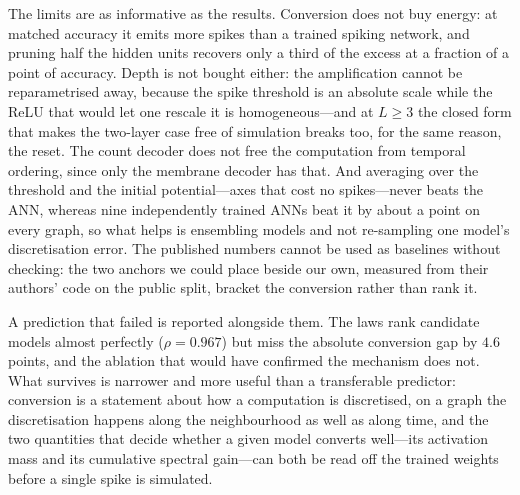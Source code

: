 The limits are as informative as the results. Conversion does not
buy energy: at matched accuracy it emits more spikes than a trained spiking network, and pruning
half the hidden units recovers only a third of the excess at a fraction of a point of accuracy.
Depth is not bought either: the amplification cannot be reparametrised away, because the spike
threshold is an absolute scale while the ReLU that would let one rescale it is homogeneous---and at
$L\ge3$ the closed form that makes the two-layer case free of simulation breaks too, for the same
reason, the reset. The count decoder does not free the computation from temporal ordering, since
only the membrane decoder has that. And averaging over the threshold and the initial
potential---axes that cost no spikes---never beats the ANN, whereas nine independently trained ANNs
beat it by about a point on every graph, so what helps is ensembling models and not re-sampling one
model's discretisation error. The published numbers cannot be used as baselines without checking:
the two anchors we could place beside our own, measured from their authors' code on the public
split, bracket the conversion rather than rank it.

A prediction that failed is reported alongside them. The laws rank candidate models almost
perfectly ($\rho=0.967$) but miss the absolute conversion gap by $4.6$ points, and the ablation that
would have confirmed the mechanism does not. What survives is narrower and more useful
than a transferable predictor: conversion is a statement about how a computation is discretised,
on a graph the discretisation happens along the neighbourhood as well as along time, and the two
quantities that decide whether a given model converts well---its activation mass and its cumulative
spectral gain---can both be read off the trained weights before a single spike is simulated.
